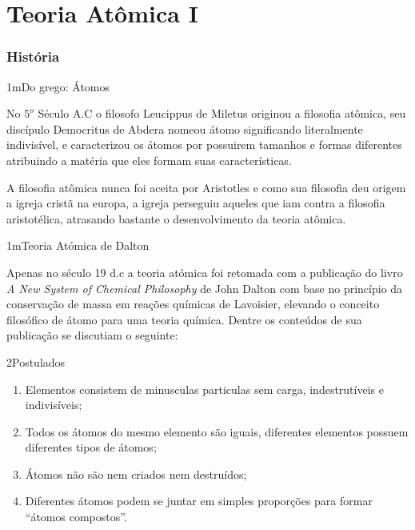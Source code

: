 \part{Teoria Atômica I}

\section*{História}

\begin{sectionBox}1m{Do grego: Átomos} %

    No \(5^o\) Século A.C o filosofo Leucippus de Miletus originou a filosofia atômica, seu discípulo Democritus de Abdera nomeou átomo significando literalmente indivisível, e caracterizou os átomos por possuirem tamanhos e formas diferentes atribuindo a matéria que eles formam suas características.

    A filosofia atômica nunca foi aceita por Aristotles e como sua filosofia deu origem a igreja cristã na europa, a igreja perseguiu aqueles que iam contra a filosofia aristotélica, atrasando bastante o desenvolvimento da teoria atômica.

\end{sectionBox}%



\begin{sectionBox}1m{Teoria Atómica de Dalton}

    Apenas no século 19 d.c a teoria atómica foi retomada com a publicação do livro \textit{A New System of Chemical Philosophy} de John Dalton com base no princípio da conservação de massa em reações químicas de Lavoisier, elevando o conceito filosófico de átomo para uma teoria química. Dentre os conteúdos de sua publicação se discutiam o seguinte:

    \begin{sectionBox}2{Postulados}
        \begin{enumerate}
            \item Elementos consistem de minusculas particulas sem carga, indestrutíveis e indivisíveis;
            \item Todos os átomos do mesmo elemento são iguais, diferentes elementos possuem diferentes tipos de átomos;
            \item Átomos não são nem criados nem destruídos;
            \item Diferentes átomos podem se juntar em simples proporções para formar ``átomos compostos''.
        \end{enumerate}
    \end{sectionBox}

\end{sectionBox}




